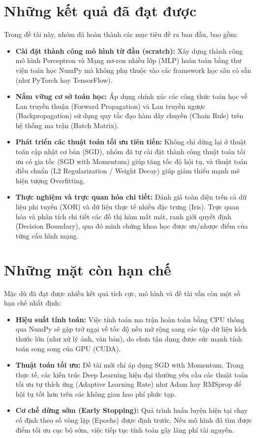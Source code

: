 \documentclass[12pt,a4paper]{report}
\begin{document}
\section{Những kết quả đã đạt được}
Trong đề tài này, nhóm đã hoàn thành các mục tiêu đề ra ban đầu, bao gồm:
\begin{itemize}
    \item \textbf{Cài đặt thành công mô hình từ đầu (scratch):} Xây dựng thành công mô hình Perceptron và Mạng nơ-ron nhiều lớp (MLP) hoàn toàn bằng thư viện toán học NumPy mà không phụ thuộc vào các framework học sâu có sẵn (như PyTorch hay TensorFlow).
    \item \textbf{Nắm vững cơ sở toán học:} Áp dụng chính xác các công thức toán học về Lan truyền thuận (Forward Propagation) và Lan truyền ngược (Backpropagation) sử dụng quy tắc đạo hàm dây chuyền (Chain Rule) trên hệ thống ma trận (Batch Matrix).
    \item \textbf{Phát triển các thuật toán tối ưu tiên tiến:} Không chỉ dừng lại ở thuật toán cập nhật cơ bản (SGD), nhóm đã tự cài đặt thành công thuật toán tối ưu có gia tốc (SGD with Momentum) giúp tăng tốc độ hội tụ, và thuật toán điều chuẩn (L2 Regularization / Weight Decay) giúp giảm thiểu mạnh mẽ hiện tượng Overfitting.
    \item \textbf{Thực nghiệm và trực quan hóa chi tiết:} Đánh giá toàn diện trên cả dữ liệu phi tuyến (XOR) và dữ liệu thực tế nhiều đặc trưng (Iris). Trực quan hóa và phân tích chi tiết các đồ thị hàm mất mát, ranh giới quyết định (Decision Boundary), qua đó minh chứng khoa học được ưu/nhược điểm của từng cấu hình mạng.
\end{itemize}

\section{Những mặt còn hạn chế}
Mặc dù đã đạt được nhiều kết quả tích cực, mô hình và đề tài vẫn còn một số hạn chế nhất định:
\begin{itemize}
    \item \textbf{Hiệu suất tính toán:} Việc tính toán ma trận hoàn toàn bằng CPU thông qua NumPy sẽ gặp trở ngại về tốc độ nếu mở rộng sang các tập dữ liệu kích thước lớn (như xử lý ảnh, văn bản), do chưa tận dụng được sức mạnh tính toán song song của GPU (CUDA).
    \item \textbf{Thuật toán tối ưu:} Đề tài mới chỉ áp dụng SGD with Momentum. Trong thực tế, các kiến trúc Deep Learning hiện đại thường yêu cầu các thuật toán tối ưu tự thích ứng (Adaptive Learning Rate) như Adam hay RMSprop để hội tụ tốt hơn trên các không gian hao phí phức tạp.
    \item \textbf{Cơ chế dừng sớm (Early Stopping):} Quá trình huấn luyện hiện tại chạy cố định theo số vòng lặp (Epochs) được định trước. Nếu mô hình đã tìm được điểm tối ưu cục bộ sớm, việc tiếp tục tính toán gây lãng phí tài nguyên.
\end{itemize}
\end{document}
